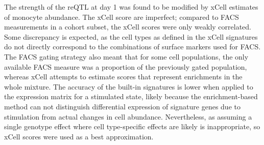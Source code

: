 %
The strength of the  \gls{reQTL} at day 1 was found to be modified by xCell estimates of monocyte abundance. 
%
The xCell score are imperfect; compared to FACS measurements in a cohort subset, the xCell scores were only weakly correlated.
Some discrepancy is expected, as the cell types as defined in the xCell signatures do not directly correspond to the combinations of surface markers used for FACS.
The FACS gating strategy also meant that for some cell populations, the only available FACS measure was a proportion of the previously gated population,
whereas xCell attempts to estimate scores that represent enrichments in the whole mixture.
The accuracy of the built-in signatures is lower when applied to the expression matrix for a stimulated state,
likely because the enrichment-based method can not distinguish differential expression of signature genes due to stimulation from actual changes in cell abundance.
Nevertheless, as assuming a single genotype effect where cell type-specific effects are likely is inappropriate, so xCell scores were used as a best approximation.
%

